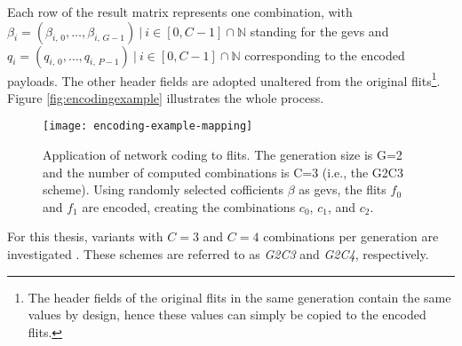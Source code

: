 Each row of the result matrix represents one combination, with $\beta_i = (\beta_{i,\,0}, …, \beta_{i,\,G-1})\ |\ i \in [0, C-1] \cap \mathbb{N}$ standing
for the \glspl{gev} and $q_i = (q_{i,\,0}, …, q_{i,\,P-1})\ |\ i \in [0, C-1] \cap \mathbb{N}$ corresponding to the encoded payloads. The other header fields
are adopted unaltered from the original flits\footnote{The header fields of the original flits in the same generation contain the same values by
design, hence these values can simply be copied to the encoded flits.}. Figure \vref{fig:encodingexample} illustrates the whole process.

\begin{figure}
    \centering
    \texttt{[image: encoding-example-mapping]}
    \caption[Application of network coding to flits]{Application of network coding to flits. The generation size is G=2 and the number of computed
    combinations is C=3 (i.e., the G2C3 scheme). Using randomly selected cofficients $\beta$ as \glspl{gev}, the flits $f_0$ and $f_1$ are encoded,
    creating the combinations $c_0$, $c_1$, and $c_2$.}
    \label{fig:encodingexample}
\end{figure}

For this thesis, variants with $C = 3$ and $C = 4$ combinations per generation are investigated \cite[cf.][2]{moriam18activeattackers}. These schemes
are referred to as \textit{G2C3} and \textit{G2C4}, respectively.

